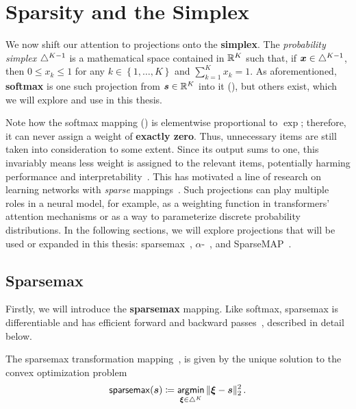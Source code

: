 \section{Sparsity and the Simplex}
\label{sec:sparsity_background}

\noindent We now shift our attention to projections onto the \textbf{simplex}. The
\textit{probability simplex} $\triangle^{K-1}$ is a mathematical space contained in $\mathbb{R}^K$
such that, if $\bm{x}\in\triangle^{K-1}$, then $0 \leq x_k \leq 1$ for any
$k\in\left\{1, \dots, K\right\}$ and $\sum_{k=1}^K x_k = 1$. As
aforementioned, \textbf{softmax} is one such projection from $\bm{s}\in\mathbb{R}^K$ into it
(), but others exist, which we will explore and use in this thesis.

Note how the softmax mapping () is elementwise
proportional to $\exp$; therefore, it can never assign a weight of
\textbf{exactly zero}. Thus, unnecessary items are still taken into
consideration to some extent. Since its output sums to one, this
invariably means less weight is assigned to the relevant items,
potentially harming performance and
interpretability~\citep{jain2019attention}. This has motivated a line
of research on learning networks with \emph{sparse}
mappings~\citep{sparsemax,fusedmax,louizos,shao2019ssn}.
Such projections can play multiple roles in a neural model,
for example, as a weighting function in transformers' attention mechanisms
or as a way to parameterize discrete probability distributions.
In the following
sections, we will explore projections that will be used or expanded in
this thesis: sparsemax~\citep{martins2016softmax},
$\alpha$-\entmaxtext~\citep{blondel2019learning,entmax}, and
SparseMAP~\cite{niculae2018sparsemap}.

\subsection{Sparsemax}\label{sec:sparsemax_bg}

\noindent Firstly, we will introduce the \textbf{sparsemax} mapping.
Like softmax, sparsemax is differentiable and has efficient forward and backward
passes~\citep{Held1974,martins2016softmax}, described in detail below.

\begin{definition}[sparsemax]
    The sparsemax transformation
    mapping~\citep{martins2016softmax}, is given by the unique solution
    to the convex optimization problem
    \begin{equation}\label{eq:sparsemax}
        \operatorname*{\mathsf{sparsemax}}(\bm{s}) \coloneqq \operatorname*{\mathsf{argmin}}_{\bm{\xi} \in \triangle^K} \| \bm{\xi} - \bm{s} \|_2^2\,.
    \end{equation}
\end{definition}

